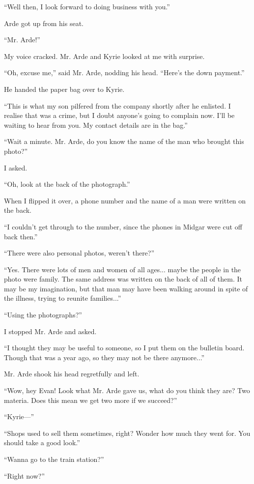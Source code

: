 \documentclass[oneside]{book}
\begin{document}
“Well then, I look forward to doing business with you.”

Arde got up from his seat.

“Mr. Arde!”

My voice cracked. Mr. Arde and Kyrie looked at me with surprise.

“Oh, excuse me,” said Mr. Arde, nodding his head. “Here’s the down payment.”

He handed the paper bag over to Kyrie.

“This is what my son pilfered from the company shortly after he enlisted. I realise that was a crime, but I doubt anyone’s going to complain now. I’ll be waiting to hear from you. My contact details are in the bag.”

“Wait a minute. Mr. Arde, do you know the name of the man who brought this photo?”

I asked.

“Oh, look at the back of the photograph.”

When I flipped it over, a phone number and the name of a man were written on the back.

“I couldn’t get through to the number, since the phones in Midgar were cut off back then.”

“There were also personal photos, weren’t there?”

“Yes. There were lots of men and women of all ages... maybe the people in the photo were family. The same address was written on the back of all of them. It may be my imagination, but that man may have been walking around in spite of the illness, trying to reunite families...”

“Using the photographs?”

I stopped Mr. Arde and asked.

“I thought they may be useful to someone, so I put them on the bulletin board. Though that was a year ago, so they may not be there anymore...”

Mr. Arde shook his head regretfully and left.

“Wow, hey Evan! Look what Mr. Arde gave us, what do you think they are? Two materia. Does this mean we get two more if we succeed?”

“Kyrie—”

“Shops used to sell them sometimes, right? Wonder how much they went for. You should take a good look.”

“Wanna go to the train station?”

“Right now?”
\end{document}
